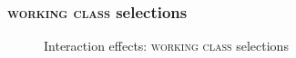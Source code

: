 \documentclass[PWPL]{article}
\begin{document}
\subsubsection{\textsc{working class} selections}
\begin{figure}[ht]
\centering
\caption{Interaction effects: \textsc{working class} selections}
\end{figure}
\end{document}
